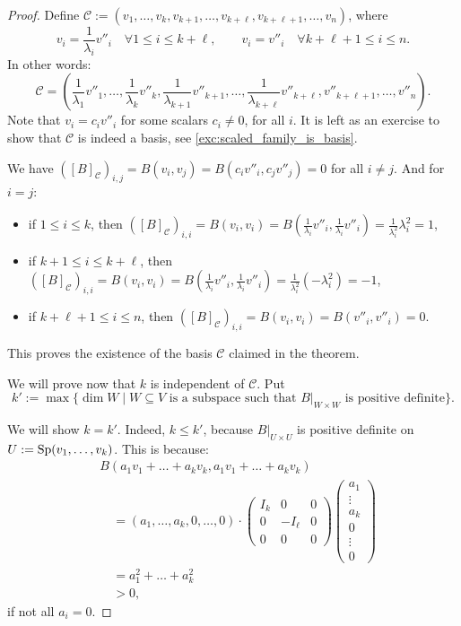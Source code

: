 \begin{proof}
Define $\mathcal{C} := (v_1, \dots, v_k, v_{k+1}, \dots, v_{k+\ell}, v_{k+\ell+1}, \dots, v_n)$, where 
\[
v_i = \frac{1}{\lambda_i} v''_i \quad \forall 1 \le i \le k+\ell, \qquad v_i = v''_i \quad \forall k+\ell+1 \le i \le n.
\]
In other words: 
\[
\mathcal{C} = \left(\frac{1}{\lambda_1} v''_1, \dots, \frac{1}{\lambda_k} v''_k, \frac{1}{\lambda_{k+1}} v''_{k+1}, \dots, \frac{1}{\lambda_{k+\ell}} v''_{k+\ell}, v''_{k+\ell+1}, \dots, v''_n\right).
\]
Note that $v_i = c_i v''_i$ for some scalars $c_i \neq 0$, for all $i$. It is left as an exercise to show that $\mathcal{C}$ is indeed a basis, see \cref{exc:scaled_family_is_basis}.

We have $([B]_{\mathcal{C}})_{i,j} = B(v_i, v_j) = B(c_i v''_i, c_j v''_j) = 0$ for all $i \neq j$.
\noindent
And for $i = j$:
\begin{itemize}
    \item if $1 \le i \le k$, then $([B]_{\mathcal{C}})_{i,i} = B(v_i, v_i) = B\left(\frac{1}{\lambda_i} v''_i, \frac{1}{\lambda_i} v''_i\right) = \frac{1}{\lambda_i^2} \lambda_i^2 = 1$,
    \item if $k+1 \le i \le k+\ell$, then $([B]_{\mathcal{C}})_{i,i} = B(v_i, v_i) = B\left(\frac{1}{\lambda_i} v''_i, \frac{1}{\lambda_i} v''_i\right) = \frac{1}{\lambda_i^2} (-\lambda_i^2) = -1$,
    \item if $k+\ell+1 \le i \le n$, then $([B]_{\mathcal{C}})_{i,i} = B(v_i, v_i) = B(v''_i, v''_i) = 0$.
\end{itemize}
This proves the existence of the basis $\mathcal{C}$ claimed in the theorem.

We will prove now that $k$ is independent of $\mathcal{C}$. Put 
\[
k' := \max \{ \dim W \mid W \subseteq V \text{ is a subspace such that } B|_{W \times W} \text{ is positive definite} \}.
\]

We will show $k = k'$. Indeed, $k \le k'$, because $B|_{U \times U}$ is positive definite on $U := \operatorname{Sp}(v_1, \dots, v_k)$. This is because:
\begin{align*}
    & B(a_1 v_1 + \dots + a_k v_k, a_1 v_1 + \dots + a_k v_k) \\
    & \quad = (a_1, \dots, a_k, 0, \dots, 0) \cdot \begin{pmatrix} I_k & 0 & 0 \\ 0 & -I_\ell & 0 \\ 0 & 0 & 0 \end{pmatrix} \begin{pmatrix} a_1 \\ \vdots \\ a_k \\ 0 \\ \vdots \\ 0 \end{pmatrix} \\
    & \quad = a_1^2 + \dots + a_k^2 \\
    & \quad > 0,
\end{align*}
if not all $a_i = 0$.


\end{proof}
